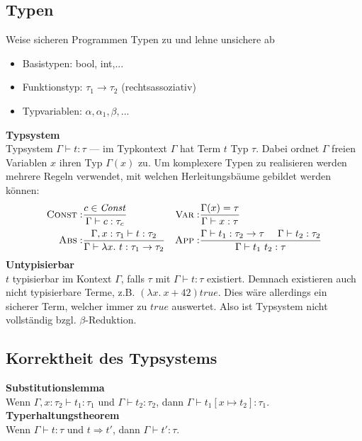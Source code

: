 \subsection{Typen}
Weise sicheren Programmen Typen zu und lehne unsichere ab
\begin{itemize}
  \item Basistypen: bool, int,...
  \item Funktionstyp: \(\tau_1 \rightarrow \tau_2\) (rechtsassoziativ)
  \item Typvariablen: \(\alpha, \alpha_1, \beta,...\)
\end{itemize}
\textbf{Typsystem}\\
Typsystem \(\Gamma \vdash t: \tau\) --- im Typkontext \(\Gamma\) hat Term \(t\) Typ \(\tau\). Dabei ordnet \(\Gamma\)
freien Variablen \(x\) ihren Typ \(\Gamma(x)\) zu.
Um komplexere Typen zu realisieren werden mehrere Regeln verwendet, mit welchen Herleitungsbäume gebildet werden können:\\
\begin{align*}
  \textsc{Const}:& \frac{c \in \mathit{Const}}{\Gamma \vdash c: \tau_c} &
  \textsc{Var}:&   \frac{\Gamma(x) = \tau}{\Gamma \vdash x: \tau}\\
  \textsc{Abs}:&   \frac{\Gamma, x: \tau_1 \vdash t: \tau_2}{\Gamma \vdash \lambda x.\ t: \tau_1 \rightarrow \tau_2} &
  \textsc{App}:&   \frac{\Gamma \vdash t_1: \tau_2 \rightarrow \tau \ \ \ \ \Gamma \vdash t_2: \tau_2}{\Gamma \vdash t_1\ t_2: \tau}                                                                                                                      
\end{align*}
\textbf{Untypisierbar}\\
\(t\) typisierbar im Kontext \(\Gamma\), falls \(\tau\) mit \(\Gamma \vdash t: \tau\) existiert.
Demnach existieren auch nicht typisierbare Terme, z.B. \((\lambda x.\ x + 42) \mathit{true}\).
Dies wäre allerdings ein sicherer Term, welcher immer zu \(\mathit{true}\) auswertet. Also ist Typsystem nicht vollständig
bzgl. \(\beta\)-Reduktion.

\subsection{Korrektheit des Typsystems}
\textbf{Substitutionslemma}\\
Wenn \(\Gamma, x: \tau_2 \vdash t_1: \tau_1\) und \(\Gamma \vdash t_2: \tau_2\), dann \(\Gamma \vdash t_1[x \mapsto t_2]: \tau_1\).\\
\textbf{Typerhaltungstheorem}\\
Wenn \(\Gamma \vdash t: \tau\) und \(t \Rightarrow t'\), dann \(\Gamma \vdash t': \tau\).
